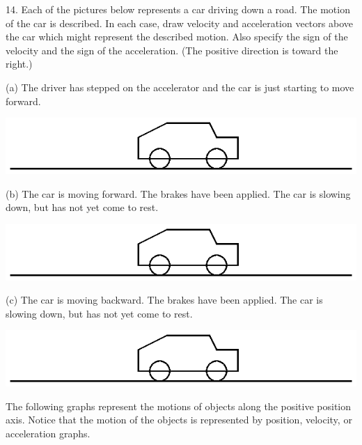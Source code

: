 14. Each of the pictures below represents a car driving down a road. The motion
of the car is described. In each case, draw velocity and acceleration vectors
above the car which might represent the described motion. Also specify the sign
of the velocity and the sign of the acceleration. (The positive direction is toward the right.)

(a) The driver has stepped on the accelerator and the car is just starting to
move forward.

\vspace{0.3cm}
{\par\centering \includegraphics{slowing/slowing_fig16.eps} \par}
\vspace{0.3cm}

(b) The car is moving forward. The brakes have been applied. The car is slowing
down, but has not yet come to rest.

\vspace{0.3cm}
{\par\centering \includegraphics{slowing/slowing_fig16.eps} \par}
\vspace{0.3cm}

(c) The car is moving backward. The brakes have been applied. The car is slowing down, but has not yet come to rest.

\vspace{0.3cm}
{\par\centering \includegraphics{slowing/slowing_fig16.eps} \par}
\vspace{0.3cm}

\newpage

The following graphs represent the motions of objects along the positive position axis. Notice that the motion of the objects is represented by position, velocity, or acceleration graphs.

